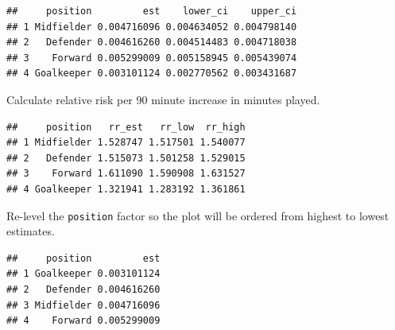 \documentclass[]{book}
\makeatletter
\newenvironment{Shaded}{\begin{snugshade}}{\end{snugshade}}
\newcommand{\KeywordTok}[1]{\textcolor[rgb]{0.13,0.29,0.53}{\textbf{{#1}}}}
\newcommand{\DataTypeTok}[1]{\textcolor[rgb]{0.13,0.29,0.53}{{#1}}}
\newcommand{\DecValTok}[1]{\textcolor[rgb]{0.00,0.00,0.81}{{#1}}}
\newcommand{\StringTok}[1]{\textcolor[rgb]{0.31,0.60,0.02}{{#1}}}
\newcommand{\NormalTok}[1]{{#1}}
\newenvironment{kframe}{%
\medskip{}
\setlength{\fboxsep}{.8em}
 \def\at@end@of@kframe{}%
 \ifinner\ifhmode%
  \def\at@end@of@kframe{\end{minipage}}%
  \begin{minipage}{\columnwidth}%
 \fi\fi%
 \def\FrameCommand##1{\hskip\@totalleftmargin \hskip-\fboxsep
 \colorbox{shadecolor}{##1}\hskip-\fboxsep
     \hskip-\linewidth \hskip-\@totalleftmargin \hskip\columnwidth}%
 \MakeFramed {\advance\hsize-\width
   \@totalleftmargin\z@ \linewidth\hsize
   \@setminipage}}%
 {\par\unskip\endMakeFramed%
 \at@end@of@kframe}
\renewenvironment{Shaded}{\begin{kframe}}{\end{kframe}}
\makeatother
\begin{document}
\begin{verbatim}
##     position         est    lower_ci    upper_ci
## 1 Midfielder 0.004716096 0.004634052 0.004798140
## 2   Defender 0.004616260 0.004514483 0.004718038
## 3    Forward 0.005299009 0.005158945 0.005439074
## 4 Goalkeeper 0.003101124 0.002770562 0.003431687
\end{verbatim}

Calculate relative risk per 90 minute increase in minutes played.

\begin{Shaded}
\end{Shaded}

\begin{verbatim}
##     position   rr_est   rr_low  rr_high
## 1 Midfielder 1.528747 1.517501 1.540077
## 2   Defender 1.515073 1.501258 1.529015
## 3    Forward 1.611090 1.590908 1.631527
## 4 Goalkeeper 1.321941 1.283192 1.361861
\end{verbatim}

Re-level the \texttt{position} factor so the plot will be ordered from
highest to lowest estimates.

\begin{Shaded}
\end{Shaded}

\begin{verbatim}
##     position         est
## 1 Goalkeeper 0.003101124
## 2   Defender 0.004616260
## 3 Midfielder 0.004716096
## 4    Forward 0.005299009
\end{verbatim}
\end{document}
